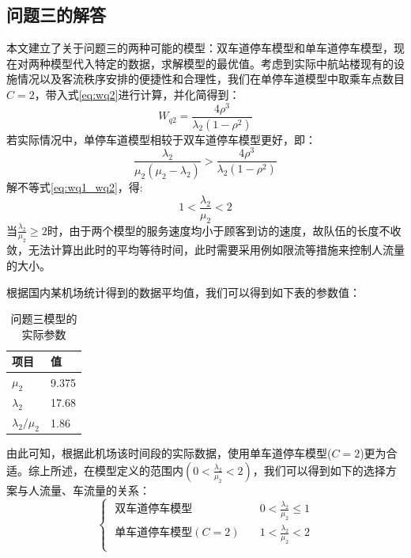\documentclass{cumcm}
\begin{document}
\subsection{问题三的解答}
本文建立了关于问题三的两种可能的模型：双车道停车模型和单车道停车模型，现在对两种模型代入特定的数据，求解模型的最优值。考虑到实际中航站楼现有的设施情况以及客流秩序安排的便捷性和合理性，我们在单停车道模型中取乘车点数目$C=2$，带入式\ref{eq:wq2}进行计算，并化简得到：
\begin{equation}
	W_{q2}=\frac{4\rho^3}{\lambda_2(1-\rho^2)}
\end{equation}
若实际情况中，单停车道模型相较于双车道停车模型更好，即：
\begin{equation}
	\frac{\lambda_2}{\mu_2(\mu_2-\lambda_2)}>\frac{4\rho^3}{\lambda_2(1-\rho^2)}
	\label{eq:wq1_wq2}
\end{equation}
解不等式\ref{eq:wq1_wq2}，得:
\begin{equation}
	1<\frac{\lambda_2}{\mu_2}<2
\end{equation}
当$\frac{\lambda_2}{\mu_2}\ge2$时，由于两个模型的服务速度均小于顾客到访的速度，故队伍的长度不收敛，无法计算出此时的平均等待时间，此时需要采用例如限流等措施来控制人流量的大小。\par
根据国内某机场统计得到的数据平均值\cite{flightdata}，我们可以得到如下表的参数值：
\begin{table}[H]
	\centering
	\caption{问题三模型的实际参数} 
	\label{table-symbol}
	\begin{tabular*}{0.31\textwidth}{p{3.5cm}p{2cm}}
		\toprule
		项目 & 值 \\
		\midrule
		$\mu_2$ & 9.375 \\
		$\lambda_2$ & 17.68 \\
		$\lambda_2/\mu_2$ & 1.86 \\
		\bottomrule
	\end{tabular*}
\end{table}
由此可知，根据此机场该时间段的实际数据，使用单车道停车模型($C=2$)更为合适。综上所述，在模型定义的范围内$(0<\frac{\lambda_2}{\mu_2}<2)$，我们可以得到如下的选择方案与人流量、车流量的关系：
\begin{equation}
	\begin{cases}
		\mbox{  双车道停车模型}\quad & 0<\frac{\lambda_2}{\mu_2}\le1 \\
		\mbox{  单车道停车模型}(C=2)\quad & 1<\frac{\lambda_2}{\mu_2}<2 \\
	\end{cases}
\end{equation}
\end{document}
